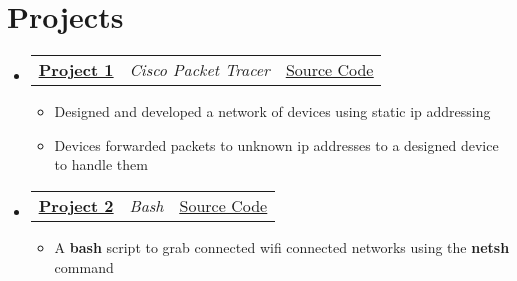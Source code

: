 \documentclass[a4paper,11pt]{article}
\makeatletter
\newcommand{\resumeItem}[1]{
	\item\small{#1}
}
\newcommand{\resumeItemListStart}{\begin{itemize}[rightmargin=0.11in]}
\newcommand{\resumeItemListEnd}{\end{itemize}}
\newcommand{\resumeTrioHeading}[3]{
	\item\small{
		\begin{tabular*}{0.96\textwidth}[t]{
				l@{\extracolsep{\fill}}c@{\extracolsep{\fill}}r
			}
			\textbf{#1} & \textit{#2} & #3
		\end{tabular*}
	}
}
\newcommand{\resumeHeadingListStart}{
	\begin{itemize}[leftmargin=0.15in, label={}]
	}
\newcommand{\resumeHeadingListEnd}{\end{itemize}}
\makeatother
\begin{document}
	\section{Projects}
	\resumeHeadingListStart{}
	\resumeTrioHeading{\href{https://github.com/ReedBanks/cisco_pkt_tracer/blob/master/saves/static_ip_config.pkt}{\uline{Project 1}}}{Cisco Packet Tracer}{\href{https://github.com/ReedBanks/cisco_pkt_tracer/blob/master/saves/static_ip_config.pkt}{\uline{Source Code}}}
	\resumeItemListStart{}
	\resumeItem{Designed and developed a network of devices using static ip addressing}
	\resumeItem{Devices forwarded packets to unknown ip addresses to a designed device to handle them}
	\resumeItemListEnd{}

	\resumeTrioHeading{\href{https://github.com/ReedBanks/windows_wifi_pwds/blob/main/yfy.sh}{\uline{Project 2}}}{Bash}{\href{https://github.com/ReedBanks/windows_wifi_pwds/blob/main/yfy.sh}{\uline{Source Code}}}
	\resumeItemListStart{}
	\resumeItem{A \textbf{bash} script to grab connected wifi connected networks using the \textbf{netsh} command }
	\resumeItemListEnd{}
	\resumeHeadingListEnd{}



\end{document}
